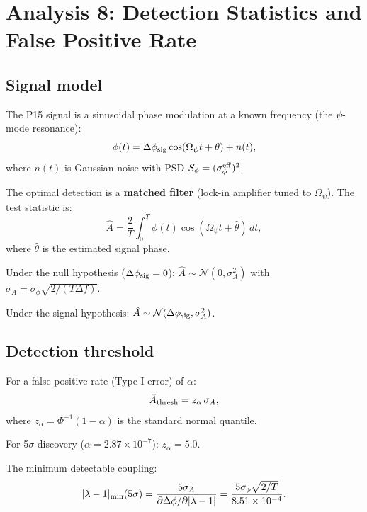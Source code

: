 \documentclass[11pt]{article}
\newcommand{\ee}[1]{\times 10^{#1}}
\newcommand{\Opsi}{\Omega_\psi}
\newcommand{\lam}{\lambda}
\begin{document}
\section{Analysis 8: Detection Statistics and False Positive Rate}
\label{sec:statistics}

\subsection{Signal model}

The P15 signal is a sinusoidal phase modulation at a known frequency
(the $\psi$-mode resonance):
\begin{equation}
\phi(t) = \Delta\phi_{\rm sig}\cos(\Opsi t + \theta) + n(t),
\end{equation}
where $n(t)$ is Gaussian noise with PSD $S_\phi = (\sigma_\phi^{\rm eff})^2$.

The optimal detection is a \textbf{matched filter}
(lock-in amplifier tuned to $\Opsi$). The test statistic is:
\begin{equation}
\hat{A} = \frac{2}{T}\int_0^T \phi(t)\cos(\Opsi t + \hat\theta)\,dt,
\end{equation}
where $\hat\theta$ is the estimated signal phase.

Under the null hypothesis ($\Delta\phi_{\rm sig} = 0$):
$\hat{A} \sim \mathcal{N}(0, \sigma_A^2)$ with
$\sigma_A = \sigma_\phi\sqrt{2/(T\Delta f)}$.

Under the signal hypothesis:
$\hat{A} \sim \mathcal{N}(\Delta\phi_{\rm sig}, \sigma_A^2)$.

\subsection{Detection threshold}

For a false positive rate (Type I error) of $\alpha$:
\begin{equation}
\hat{A}_{\rm thresh} = z_\alpha\,\sigma_A,
\end{equation}
where $z_\alpha = \Phi^{-1}(1-\alpha)$ is the standard normal quantile.

For 5$\sigma$ discovery ($\alpha = 2.87\ee{-7}$): $z_\alpha = 5.0$.

The minimum detectable coupling:
\begin{equation}
|\lam-1|_{\rm min}(5\sigma) = \frac{5\sigma_A}
{\partial\Delta\phi/\partial|\lam-1|}
= \frac{5\sigma_\phi\sqrt{2/T}}
{8.51\ee{-4}}.
\end{equation}
\end{document}
